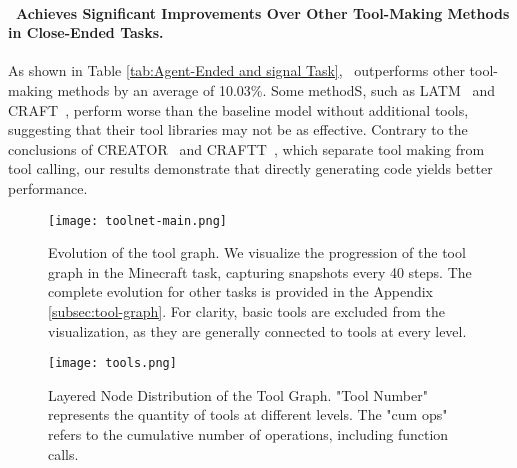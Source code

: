 \paragraph{\ours\ Achieves Significant Improvements Over Other Tool-Making Methods in Close-Ended Tasks.}
As shown in Table \ref{tab:Agent-Ended and signal Task}, \ours\ outperforms other tool-making methods by an average of 10.03\%. Some methodS, such as LATM~\citep{cai2023large} and CRAFT~\citep{yuan2023craft}, perform worse than the baseline model without additional tools, suggesting that their tool libraries may not be as effective. Contrary to the conclusions of CREATOR~\citep{qian2023creator} and CRAFTT~\citep{yuan2023craft}, which separate tool making from tool calling, our results demonstrate that directly generating code yields better performance. 

\begin{figure*}[ht]
\begin{center}
    \begin{minipage}{0.48\textwidth}
        \vspace*{0pt}
        \centering
        \texttt{[image: toolnet-main.png]}
        \caption{Evolution of the tool graph. We visualize the progression of the tool graph in the Minecraft task, capturing snapshots every 40 steps. The complete evolution for other tasks is provided in the Appendix \ref{subsec:tool-graph}. For clarity, basic tools are excluded from the visualization, as they are generally connected to tools at every level.}
        \label{fig:evlove}
    \end{minipage} 
    \hfill
    \begin{minipage}{0.48\textwidth}
        \vspace*{0pt}
        \centering
        \texttt{[image: tools.png]}
        \vskip -0.1in
        \caption{Layered Node Distribution of the Tool Graph. "Tool Number" represents the quantity of tools at different levels. The "cum ops" refers to the cumulative number of operations, including function calls.}
        \label{fig:tools}
    \end{minipage}
\end{center}
\vskip -0.3in
\end{figure*}



